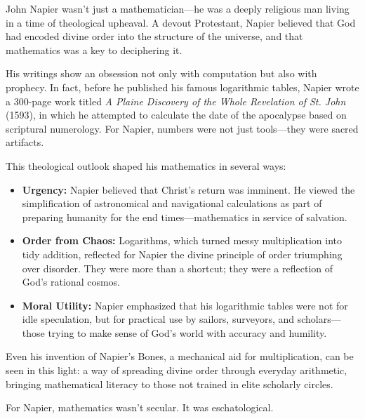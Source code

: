 \begin{tcolorbox}[colback=gray!5!white, colframe=black!80!white, title={Historical Sidebar: John Napier, Divine Order, and the Mathematics of the Apocalypse}, fonttitle=\bfseries, arc=1.5mm, boxrule=0.4pt]
    John Napier wasn’t just a mathematician—he was a deeply religious man living in a time of theological upheaval. A devout Protestant, Napier believed that God had encoded divine order into the structure of the universe, and that mathematics was a key to deciphering it.
    
    His writings show an obsession not only with computation but also with prophecy. In fact, before he published his famous logarithmic tables, Napier wrote a 300-page work titled \textit{A Plaine Discovery of the Whole Revelation of St. John} (1593), in which he attempted to calculate the date of the apocalypse based on scriptural numerology. For Napier, numbers were not just tools—they were sacred artifacts.
    
    This theological outlook shaped his mathematics in several ways:
    
    \begin{itemize}
        \item \textbf{Urgency:} Napier believed that Christ’s return was imminent. He viewed the simplification of astronomical and navigational calculations as part of preparing humanity for the end times—mathematics in service of salvation.
        
        \item \textbf{Order from Chaos:} Logarithms, which turned messy multiplication into tidy addition, reflected for Napier the divine principle of order triumphing over disorder. They were more than a shortcut; they were a reflection of God’s rational cosmos.
        
        \item \textbf{Moral Utility:} Napier emphasized that his logarithmic tables were not for idle speculation, but for practical use by sailors, surveyors, and scholars—those trying to make sense of God's world with accuracy and humility.
    \end{itemize}
    
    Even his invention of Napier’s Bones, a mechanical aid for multiplication, can be seen in this light: a way of spreading divine order through everyday arithmetic, bringing mathematical literacy to those not trained in elite scholarly circles.
    
    For Napier, mathematics wasn’t secular. It was eschatological.
\end{tcolorbox}


